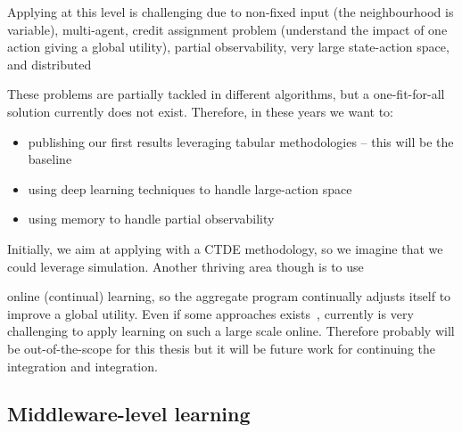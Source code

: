 \documentclass[11pt]{article}
\begin{document}
Applying \rl{} at this level is challenging due to non-fixed input (the neighbourhood is variable), multi-agent, credit assignment problem (understand the impact of one action giving a global utility), partial observability, very large state-action space, and distributed

These problems are partially tackled in different \marl{} algorithms, but a one-fit-for-all solution currently does not exist. Therefore, in these years we want to:
\begin{itemize}
	\item publishing our first results leveraging tabular methodologies -- this will be the baseline
	\item using deep learning techniques to handle large-action space
	\item using memory to handle partial observability
\end{itemize}
Initially, we aim at applying \rl{} with a CTDE methodology, so we imagine that we could leverage simulation.
Another thriving area though is to use \item{online} (continual) learning, so the aggregate program continually adjusts itself to improve a global utility. Even if some approaches exists~\cite{DBLP:conf/icml/OmidshafieiPAHV17}, currently is very challenging to apply learning on such a large scale online. Therefore probably will be out-of-the-scope for this thesis but it will be future work for continuing the integration \ac{} and \rl{} integration. 
\subsection{Middleware-level learning}



\end{document}
